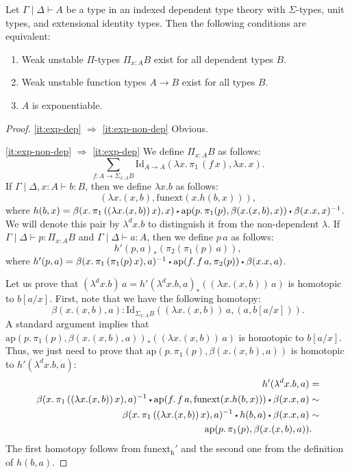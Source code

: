 \documentclass[reqno]{amsart}
\theoremstyle{definition}
\theoremstyle{remark}
\newcommand{\ob}{}
\newcommand{\fs}[1]{\mathrm{#1}}
\newcommand{\Id}{\fs{Id}}
\newcommand{\sym}[1]{#1^{-1}}
\newcommand{\pmap}{\fs{ap}}
\numberwithin{figure}{section}
\newcommand{\ct}{%
  \mathchoice{\mathbin{\raisebox{0.25ex}{$\displaystyle\centerdot$}}}%
             {\mathbin{\raisebox{0.25ex}{$\centerdot$}}}%
             {\mathbin{\raisebox{0.25ex}{$\scriptstyle\,\centerdot\,$}}}%
             {\mathbin{\raisebox{0.25ex}{$\scriptscriptstyle\,\centerdot\,$}}}
}
\begin{document}
\begin{prop}[lccc]
Let $\Gamma \mid \Delta \vdash A \ob$ be a type in an indexed dependent type theory with $\Sigma$-types, unit types, and extensional identity types.
Then the following conditions are equivalent:
\begin{enumerate}
\item \label{it:exp-dep} Weak unstable $\Pi$-types $\Pi_{x : A} B$ exist for all dependent types $B$.
\item \label{it:exp-non-dep} Weak unstable function types $A \to B$ exist for all types $B$.
\item \label{it:exp-exp} $A$ is exponentiable.
\end{enumerate}
\end{prop}
\begin{proof}
\eqref{it:exp-dep} $\Rightarrow$ \eqref{it:exp-non-dep} Obvious.

\eqref{it:exp-non-dep} $\Rightarrow$ \eqref{it:exp-dep} 
We define $\Pi_{x : A} B$ as follows:
\[ \sum_{f : A \to \Sigma_{x : A} B} \Id_{A \to A}(\lambda x.\,\pi_1\,(f\,x), \lambda x.\,x). \]
If $\Gamma \mid \Delta, x : A \vdash b : B$, then we define $\lambda x.b$ as follows:
\[ (\lambda x.(x,b), \fs{funext}(x. h(b,x))), \]
where $h(b,x) = \beta(x.\,\pi_1\,((\lambda x.(x,b))\,x),x) \ct \pmap(p.\,\pi_1(p), \beta(x.(x,b),x)) \ct \sym{\beta(x.x,x)}$.
We will denote this pair by $\lambda^d x.b$ to distinguish it from the non-dependent $\lambda$.
If $\Gamma \mid \Delta \vdash p : \Pi_{x : A} B$ and $\Gamma \mid \Delta \vdash a : A$, then we define $p\,a$ as follows:
\[ h'(p,a)_*(\pi_2(\pi_1(p)\,a)), \]
where $h'(p,a) = \sym{\beta(x.\,\pi_1\,(\pi_1(p)\,x),a)} \ct \pmap(f.\,f\,a,\pi_2(p)) \ct \beta(x.x,a)$.

Let us prove that $(\lambda^d x.b)\,a = h'(\lambda^d x.b,a)_*((\lambda x.(x,b))\,a)$ is homotopic to $b[a/x]$.
First, note that we have the following homotopy:
\[ \beta(x.(x,b),a) : \Id_{\Sigma_{x : A} B}((\lambda x.(x,b))\,a,(a,b[a/x])). \]
A standard argument implies that $\pmap(p.\,\pi_1(p),\beta(x.(x,b),a))_*((\lambda x.(x,b))\,a)$ is homotopic to $b[a/x]$.
Thus, we just need to prove that $\pmap(p.\,\pi_1(p),\beta(x.(x,b),a))$ is homotopic to $h'(\lambda^d x.b,a)$:
\begin{align*}
h'(\lambda^d x.b,a) & = \\
\sym{\beta(x.\,\pi_1\,((\lambda x.(x,b))\,x),a)} \ct \pmap(f.\,f\,a,\fs{funext}(x. h(b,x))) \ct \beta(x.x,a) & \sim \\
\sym{\beta(x.\,\pi_1\,((\lambda x.(x,b))\,x),a)} \ct h(b,a) \ct \beta(x.x,a) & \sim \\
\pmap(p.\,\pi_1(p), \beta(x.(x,b),a)) & .
\end{align*}
The first homotopy follows from $\fs{funext_h'}$ and the second one from the definition of $h(b,a)$.


\end{proof}
\end{document}
